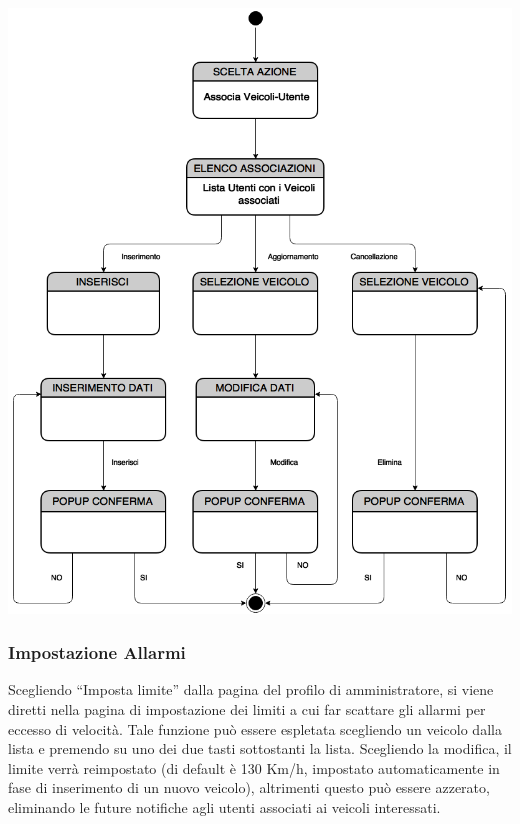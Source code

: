 \documentclass[a4paper,12pt]{beamer}
\begin{document}
\begin{frame}
\begin{center}
\includegraphics[scale=0.2]{../UseCase/Associa.png}
\end{center}
\end{frame}



\begin{frame}
\frametitle{Impostazione Allarmi}
Scegliendo ``Imposta limite'' dalla pagina del profilo di amministratore, si viene diretti nella pagina di impostazione dei limiti a cui far scattare gli allarmi per eccesso di velocità. Tale funzione può essere espletata scegliendo un veicolo dalla lista e premendo su uno dei due tasti sottostanti la lista. Scegliendo la modifica, il limite verrà reimpostato (di default è 130 Km/h, impostato automaticamente in fase di inserimento di un nuovo veicolo), altrimenti questo può essere azzerato, eliminando le future notifiche agli utenti associati ai veicoli interessati.
\end{frame}
\end{document}
